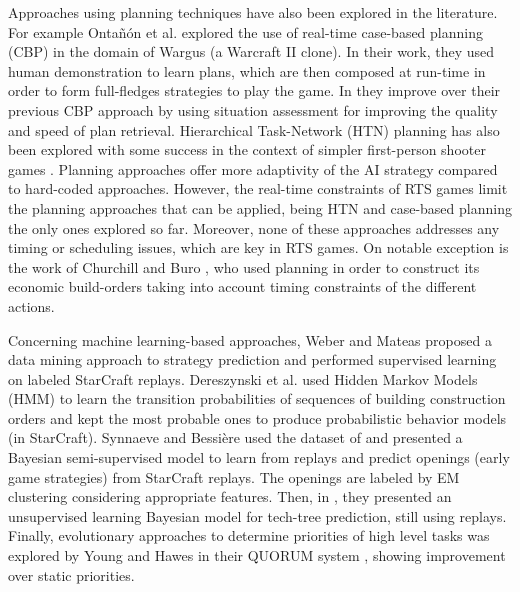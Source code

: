 \documentclass[journal]{IEEEtran}
\begin{document}
Approaches using planning techniques have also been explored in the literature. For example Onta\~{n}\'{o}n et al. \cite{CBR_Planning} explored the use of real-time case-based planning (CBP) in the domain of Wargus (a Warcraft II clone). In their work, they used human demonstration to learn plans, which are then composed at run-time in order to form full-fledges strategies to play the game. In \cite{PlanRetrieval} they improve over  their previous CBP approach by using situation assessment for improving the quality and speed of plan retrieval. Hierarchical Task-Network (HTN) planning has also been explored with some success in the context of simpler first-person shooter games \cite{HTNPlanning}. Planning approaches offer more adaptivity of the AI strategy compared to hard-coded approaches. However, the real-time constraints of RTS games limit the planning approaches that can be applied, being HTN and case-based planning the only ones explored so far. Moreover, none of these approaches addresses any timing or scheduling issues, which are key in RTS games. On notable exception is the work of Churchill and Buro \cite{churchill2011build}, who used planning in order to construct its economic build-orders taking into account timing constraints of the different actions.

Concerning machine learning-based approaches, Weber and Mateas \cite{WeberCig09} proposed a data mining approach to strategy prediction and performed supervised learning on labeled StarCraft replays. Dereszynski et al. \cite{HMMstrat_RTS_AIIDE11} used Hidden Markov Models (HMM) to learn the transition probabilities of sequences of building construction orders and kept the most probable ones to produce probabilistic behavior models (in StarCraft). Synnaeve and Bessi\`{e}re \cite{SynnaeveOpeningCig11} used the dataset of \cite{WeberCig09} and presented a Bayesian semi-supervised model to learn from replays and predict openings (early game strategies) from StarCraft replays. The openings are labeled by EM clustering considering appropriate features. Then, in \cite{SynnaeveAIIDE11}, they presented an unsupervised learning Bayesian model for tech-tree prediction, still using replays. %
Finally, evolutionary approaches to determine priorities of high level tasks was explored by Young and Hawes in their QUORUM system \cite{young2012evolutionary}, showing improvement over static priorities.
\end{document}
